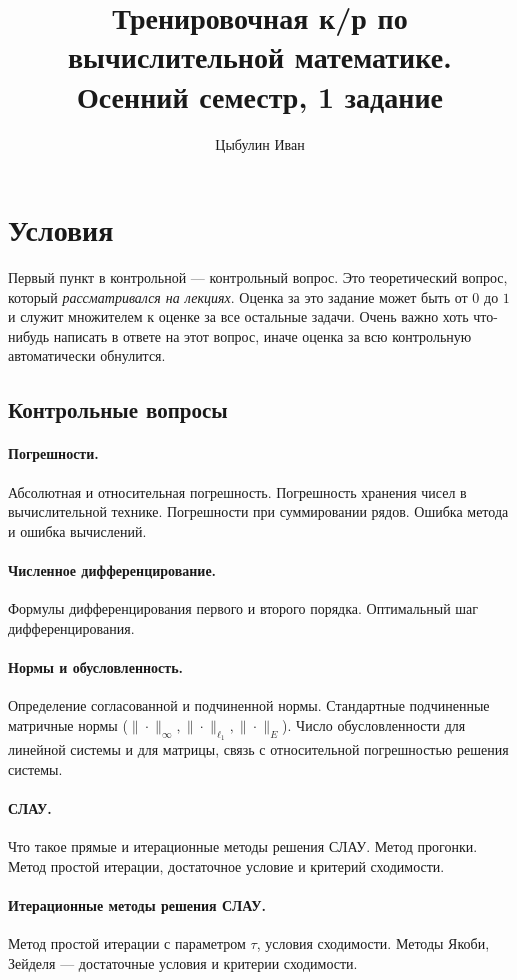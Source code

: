 \documentclass[12pt]{article}
\author{Цыбулин Иван}
\title{Тренировочная к/р по вычислительной математике. Осенний семестр, 1 задание}
\begin{document}
\maketitle

\section{Условия}

Первый пункт в контрольной --- контрольный вопрос. Это теоретический вопрос, который \emph{рассматривался на лекциях}.
Оценка за это задание может быть от $0$ до $1$ и служит множителем к оценке за все остальные задачи. Очень важно хоть что-нибудь написать в ответе на этот вопрос, иначе оценка за всю контрольную автоматически обнулится.

\subsection{Контрольные вопросы}

\paragraph{Погрешности.} Абсолютная и относительная погрешность. Погрешность хранения чисел в вычислительной технике. Погрешности при суммировании рядов. Ошибка метода и ошибка вычислений.
\paragraph{Численное дифференцирование.} Формулы дифференцирования первого и второго порядка. Оптимальный шаг дифференцирования.
\paragraph{Нормы и обусловленность.} Определение согласованной и подчиненной нормы. Стандартные подчиненные матричные нормы ($\|\cdot\|_\infty, \|\cdot\|_{\ell_1}, \|\cdot\|_E$). Число обусловленности для линейной системы и для матрицы, связь с относительной погрешностью решения системы. 
\paragraph{СЛАУ.} Что такое прямые и итерационные методы решения СЛАУ. Метод прогонки. Метод простой итерации, достаточное условие и критерий сходимости.
\paragraph{Итерационные методы решения СЛАУ.} Метод простой итерации с параметром $\tau$, условия сходимости. Методы Якоби, Зейделя --- достаточные условия и критерии сходимости.
\end{document}
